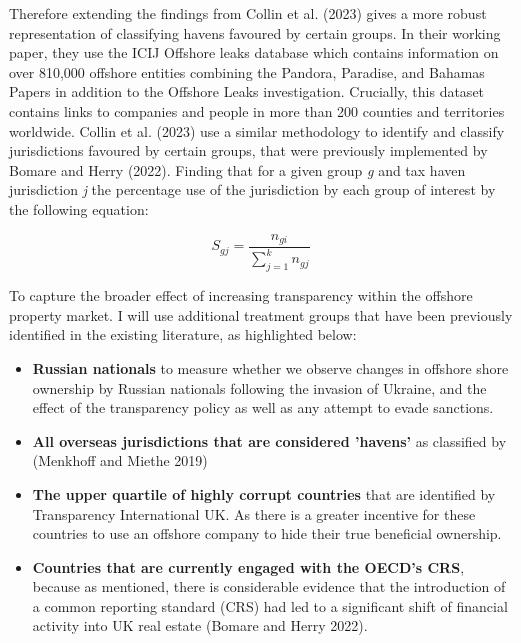 \documentclass{article}
\begin{document}
Therefore extending the findings from Collin et al. (2023) gives a more robust representation of classifying havens favoured by certain groups. In their working paper, they use the ICIJ Offshore leaks database which contains information on over 810,000 offshore entities combining the Pandora, Paradise, and Bahamas Papers in addition to the Offshore Leaks investigation. Crucially, this dataset contains links to companies and people in more than 200 counties and territories worldwide.  Collin et al. (2023) use a similar methodology to identify and classify jurisdictions favoured by certain groups, that were previously implemented by Bomare and Herry (2022). Finding that for a given group \textit{g} and tax haven jurisdiction \textit{j} the percentage use of the jurisdiction by each group of interest by the following equation:		

\vspace{0.4cm}
\begin{equation}
S_{gj} = \frac{n_{gi}}{\sum_{j=1}^{k} n_{gj}}
\end{equation}



To capture the broader effect of increasing transparency within the offshore property market. I will use additional treatment groups that have been previously identified in the existing literature, as highlighted below:

\begin{itemize}
    \item \textbf{Russian nationals} to measure whether we observe changes in offshore shore ownership by Russian nationals following the invasion of Ukraine, and the effect of the transparency policy as well as any attempt to evade sanctions. 
    \item \textbf{All overseas jurisdictions that are considered 'havens'} as classified by (Menkhoff and Miethe 2019) 
    \item \textbf{The upper quartile of highly corrupt countries} that are identified by Transparency International UK. As there is a greater incentive for these countries to use an offshore company to hide their true beneficial ownership.  
    \item \textbf{Countries that are currently engaged with the OECD’s CRS}, because as mentioned, there is considerable evidence that the introduction of a common reporting standard (CRS) had led to a significant shift of financial activity into UK real estate (Bomare and Herry 2022). 
\end{itemize}
\end{document}
